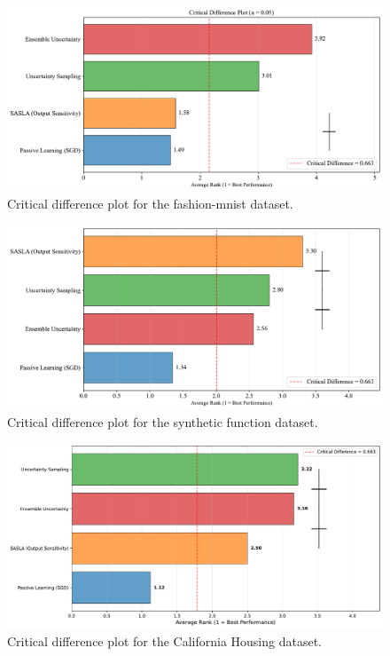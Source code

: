 \documentclass[10pt, conference]{IEEEtran}
\begin{document}

\begin{figure}[!t]
	\centering
	\includegraphics[width=\linewidth]{../results/fashion/critical_difference_plot.pdf}
	\caption{Critical difference plot for the fashion-mnist dataset.}
	\label{fig:cd_fashion}
\end{figure}

\begin{figure}[!t]
	\centering
	\includegraphics[width=\linewidth]{../results/synfunc/critical_difference_plot.pdf}
	\caption{Critical difference plot for the synthetic function dataset.}
	\label{fig:cd_synfunc}
\end{figure}

\begin{figure}[!t]
	\centering
	\includegraphics[width=\linewidth]{../results/housing/critical_difference_plot.pdf}
	\caption{Critical difference plot for the California Housing dataset.}
	\label{fig:cd_housing}
\end{figure}
\end{document}
